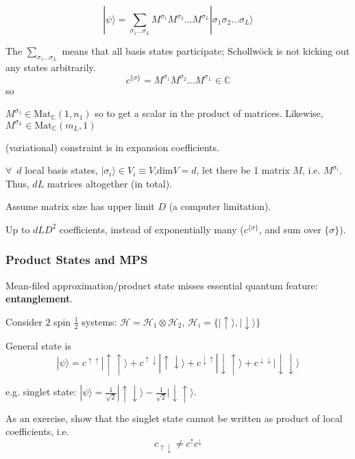 \documentclass[10pt]{amsart}
\begin{document}
\begin{multicols*}{2}
\begin{equation}
| \psi \rangle = \sum_{\sigma_1 \dots \sigma_L} M^{\sigma_1} M^{\sigma_2} \dots M^{\sigma_L} | \sigma_1 \sigma_2 \dots \sigma_L \rangle
\end{equation}

The $\sum_{\sigma_1 \dots \sigma_L}$ means that all basis states participate; Schollw\"{o}ck is not kicking out any states arbitrarily. 
\[
c^{\lbrace \sigma \rbrace} = M^{\sigma_1} M^{\sigma_2} \dots M^{\sigma_L} \in \mathbb{C}
\] so

$M^{\sigma_1} \in \text{Mat}_{\mathbb{C}}(1, n_1)$ so to get a scalar in the product of matrices. Likewise, $M^{\sigma_L} \in \text{Mat}_{\mathbb{C}}(m_L, 1)$

(variational) constraint is in expansion coefficients. 

$\forall \, $ $d$ local basis states, $|\sigma_i \rangle \in V_i \equiv V$,$\text{dim}V = d$, let there be 1 matrix $M$, i.e. $M^{\sigma_i}$.  \\
Thus, $dL$ matrices altogether (in total).

Assume matrix size has upper limit $D$ (a computer limitation).

Up to $dLD^2$ coefficients, instead of exponentially many ($c^{\lbrace \sigma \rbrace}$, and sum over $\lbrace \sigma \rbrace$). 

\subsubsection{Product States and MPS}

Mean-filed approximation/product state misses essential quantum feature: \textbf{entanglement}. 

Consider 2 spin $\frac{1}{2}$ systems: $\mathcal{H} = \mathcal{H}_1 \otimes \mathcal{H}_2$, $\mathcal{H}_i = \lbrace | \uparrow \rangle, | \downarrow \rangle \rbrace$

General state is 
\[
| \psi \rangle = c^{ \uparrow \uparrow} | \uparrow \uparrow \rangle + c^{ \uparrow \downarrow} | \uparrow \downarrow \rangle + c^{ \downarrow \uparrow} | \downarrow \uparrow \rangle + c^{ \downarrow \downarrow} | \downarrow \downarrow \rangle 
\]

e.g. singlet state: $|\psi \rangle = \frac{1}{ \sqrt{2} } | \uparrow \downarrow \rangle - \frac{1}{ \sqrt{2} } | \downarrow \uparrow \rangle $. 

As an exercise, show that the singlet state cannot be written as product of local coefficients, i.e. 
\[
c_{\uparrow \downarrow } \neq c^{\uparrow} c^{ \downarrow }
\]


\end{multicols*}
\end{document}
